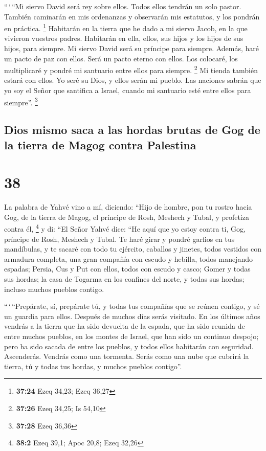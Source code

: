  ``\,`\,``Mi siervo David será rey sobre ellos. Todos
ellos tendrán un solo pastor. También caminarán en mis ordenanzas y
observarán mis estatutos, y los pondrán en práctica. \footnote{\textbf{37:24}
  Ezeq 34,23; Ezeq 36,27}  Habitarán en la tierra que he
dado a mi siervo Jacob, en la que vivieron vuestros padres. Habitarán en
ella, ellos, sus hijos y los hijos de sus hijos, para siempre. Mi siervo
David será su príncipe para siempre.  Además, haré un
pacto de paz con ellos. Será un pacto eterno con ellos. Los colocaré,
los multiplicaré y pondré mi santuario entre ellos para siempre.
\footnote{\textbf{37:26} Ezeq 34,25; Is 54,10}  Mi tienda
también estará con ellos. Yo seré su Dios, y ellos serán mi pueblo.
 Las naciones sabrán que yo soy el Señor que santifica a
Israel, cuando mi santuario esté entre ellos para siempre''. \footnote{\textbf{37:28}
  Ezeq 36,36}

\hypertarget{dios-mismo-saca-a-las-hordas-brutas-de-gog-de-la-tierra-de-magog-contra-palestina}{%
\subsection{Dios mismo saca a las hordas brutas de Gog de la tierra de
Magog contra
Palestina}\label{dios-mismo-saca-a-las-hordas-brutas-de-gog-de-la-tierra-de-magog-contra-palestina}}

\hypertarget{section-37}{%
\section{38}\label{section-37}}

 La palabra de Yahvé vino a mí, diciendo: 
``Hijo de hombre, pon tu rostro hacia Gog, de la tierra de Magog, el
príncipe de Rosh, Meshech y Tubal, y profetiza contra él, \footnote{\textbf{38:2}
  Ezeq 39,1; Apoc 20,8; Ezeq 32,26}  y di: ``El Señor
Yahvé dice: ``He aquí que yo estoy contra ti, Gog, príncipe de Rosh,
Meshech y Tubal.  Te haré girar y pondré garfios en tus
mandíbulas, y te sacaré con todo tu ejército, caballos y jinetes, todos
vestidos con armadura completa, una gran compañía con escudo y hebilla,
todos manejando espadas;  Persia, Cus y Put con ellos,
todos con escudo y casco;  Gomer y todas sus hordas; la
casa de Togarma en los confines del norte, y todas sus hordas; incluso
muchos pueblos contigo.

 ``\,`\,``Prepárate, sí, prepárate tú, y todas tus
compañías que se reúnen contigo, y sé un guardia para ellos.
 Después de muchos días serás visitado. En los últimos
años vendrás a la tierra que ha sido devuelta de la espada, que ha sido
reunida de entre muchos pueblos, en los montes de Israel, que han sido
un continuo despojo; pero ha sido sacada de entre los pueblos, y todos
ellos habitarán con seguridad.  Ascenderás. Vendrás como
una tormenta. Serás como una nube que cubrirá la tierra, tú y todas tus
hordas, y muchos pueblos contigo''.

